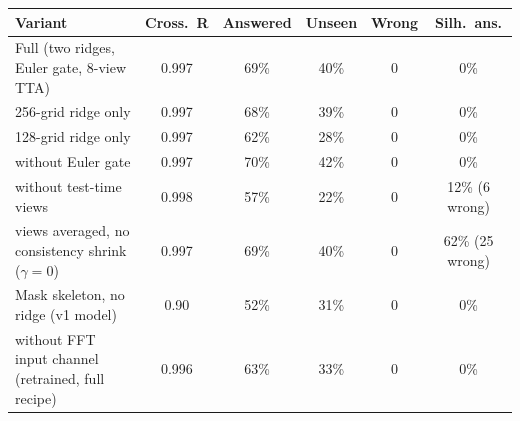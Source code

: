 \begin{tabular}{@{}lccccc@{}}
\toprule
Variant & Cross.\ R & Answered & Unseen & Wrong & Silh.\ ans. \\
\midrule
Full (two ridges, Euler gate, 8-view TTA) & 0.997 & 69\% & 40\% & 0 & 0\% \\
256-grid ridge only & 0.997 & 68\% & 39\% & 0 & 0\% \\
128-grid ridge only & 0.997 & 62\% & 28\% & 0 & 0\% \\
without Euler gate & 0.997 & 70\% & 42\% & 0 & 0\% \\
without test-time views & 0.998 & 57\% & 22\% & 0 & 12\% (6 wrong) \\
views averaged, no consistency shrink ($\gamma=0$) & 0.997 & 69\% & 40\% & 0 & 62\% (25 wrong) \\
Mask skeleton, no ridge (v1 model) & 0.90 & 52\% & 31\% & 0 & 0\% \\
\midrule
without FFT input channel (retrained, full recipe) & 0.996 & 63\% & 33\% & 0 & 0\% \\
\bottomrule
\end{tabular}
